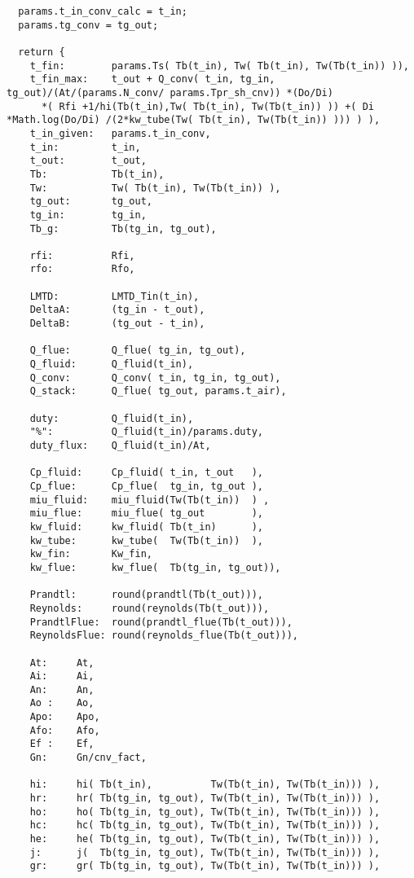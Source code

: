 \begin{verbatim}
  params.t_in_conv_calc = t_in;
  params.tg_conv = tg_out;

  return {
    t_fin:        params.Ts( Tb(t_in), Tw( Tb(t_in), Tw(Tb(t_in)) )),
    t_fin_max:    t_out + Q_conv( t_in, tg_in, tg_out)/(At/(params.N_conv/ params.Tpr_sh_cnv)) *(Do/Di) 
      *( Rfi +1/hi(Tb(t_in),Tw( Tb(t_in), Tw(Tb(t_in)) )) +( Di *Math.log(Do/Di) /(2*kw_tube(Tw( Tb(t_in), Tw(Tb(t_in)) ))) ) ),
    t_in_given:   params.t_in_conv,
    t_in:         t_in,
    t_out:        t_out,
    Tb:           Tb(t_in),
    Tw:           Tw( Tb(t_in), Tw(Tb(t_in)) ),
    tg_out:       tg_out,
    tg_in:        tg_in,
    Tb_g:         Tb(tg_in, tg_out),

    rfi:          Rfi,
    rfo:          Rfo,

    LMTD:         LMTD_Tin(t_in),
    DeltaA:       (tg_in - t_out),
    DeltaB:       (tg_out - t_in),

    Q_flue:       Q_flue( tg_in, tg_out),
    Q_fluid:      Q_fluid(t_in),
    Q_conv:       Q_conv( t_in, tg_in, tg_out),
    Q_stack:      Q_flue( tg_out, params.t_air),

    duty:         Q_fluid(t_in),
    "%":          Q_fluid(t_in)/params.duty,
    duty_flux:    Q_fluid(t_in)/At,

    Cp_fluid:     Cp_fluid( t_in, t_out   ),
    Cp_flue:      Cp_flue(  tg_in, tg_out ),
    miu_fluid:    miu_fluid(Tw(Tb(t_in))  ) ,
    miu_flue:     miu_flue( tg_out        ),
    kw_fluid:     kw_fluid( Tb(t_in)      ),
    kw_tube:      kw_tube(  Tw(Tb(t_in))  ),
    kw_fin:       Kw_fin,
    kw_flue:      kw_flue(  Tb(tg_in, tg_out)),

    Prandtl:      round(prandtl(Tb(t_out))),
    Reynolds:     round(reynolds(Tb(t_out))),
    PrandtlFlue:  round(prandtl_flue(Tb(t_out))),
    ReynoldsFlue: round(reynolds_flue(Tb(t_out))),

    At:     At,
    Ai:     Ai,
    An:     An,
    Ao :    Ao,
    Apo:    Apo,
    Afo:    Afo,
    Ef :    Ef,
    Gn:     Gn/cnv_fact,

    hi:     hi( Tb(t_in),          Tw(Tb(t_in), Tw(Tb(t_in))) ),
    hr:     hr( Tb(tg_in, tg_out), Tw(Tb(t_in), Tw(Tb(t_in))) ),
    ho:     ho( Tb(tg_in, tg_out), Tw(Tb(t_in), Tw(Tb(t_in))) ),
    hc:     hc( Tb(tg_in, tg_out), Tw(Tb(t_in), Tw(Tb(t_in))) ),
    he:     he( Tb(tg_in, tg_out), Tw(Tb(t_in), Tw(Tb(t_in))) ),
    j:      j(  Tb(tg_in, tg_out), Tw(Tb(t_in), Tw(Tb(t_in))) ),
    gr:     gr( Tb(tg_in, tg_out), Tw(Tb(t_in), Tw(Tb(t_in))) ),


\end{verbatim}
